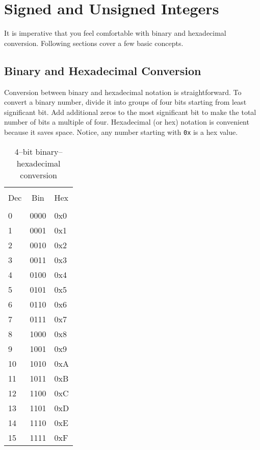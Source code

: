 \documentclass[12pt,a4paper]{article}
\begin{document}
\section{Signed and Unsigned Integers}
It is imperative that you feel comfortable with binary and hexadecimal conversion. Following sections cover a few basic concepts.

\subsection{Binary and Hexadecimal Conversion}
Conversion between binary and hexadecimal notation is straightforward. To convert a binary number, divide it into groups of four bits starting from least significant bit. Add additional zeros to the most significant bit to make the total number of bits a multiple of four. Hexadecimal (or hex) notation is convenient because it saves space. Notice, any number starting with \verb|0x| is a hex value.

\begin{table}[H]
\centering
\label{4-bit-bin-hex-table}
	\begin{tabular}{l c l}
	\hline \hline \\ [-2ex]
	Dec & Bin & Hex\\
	\hline \\ [-2ex]
	0  & 0000 & 0x0\\
	1  & 0001 & 0x1\\
	2  & 0010 & 0x2\\
	3  & 0011 & 0x3\\
	4  & 0100 & 0x4\\
	5  & 0101 & 0x5\\
	6  & 0110 & 0x6\\
	7  & 0111 & 0x7\\
	8  & 1000 & 0x8\\
	9  & 1001 & 0x9\\
	10 & 1010 & 0xA\\
	11 & 1011 & 0xB\\
	12 & 1100 & 0xC\\
	13 & 1101 & 0xD\\
	14 & 1110 & 0xE\\
	15 & 1111 & 0xF\\
	\hline \hline
	\end{tabular}
\caption{4--bit binary--hexadecimal conversion}
\end{table}
\end{document}
